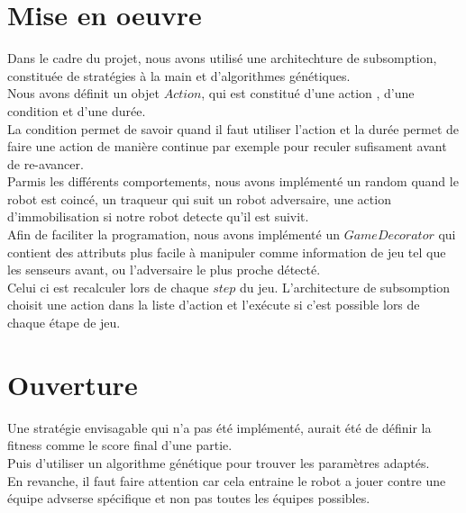 \documentclass[11pt]{article}
\begin{document}
\section{Mise en oeuvre}
Dans le cadre du projet, nous avons utilisé une architechture de subsomption, constituée de stratégies à la main et d'algorithmes génétiques. \\
Nous avons définit un objet $Action$, qui est constitué d'une action , d'une condition et d'une durée. \\
La condition permet de savoir quand il faut utiliser l'action et la durée permet de faire une action de manière continue par exemple pour reculer sufisament avant de re-avancer. \\
Parmis les différents comportements, nous avons implémenté un random quand le robot est coincé, un traqueur qui suit un robot adversaire, une action d'immobilisation si notre robot detecte qu'il est suivit. \\
Afin de faciliter la programation, nous avons implémenté un $GameDecorator$ qui contient des attributs plus facile à manipuler comme information de jeu tel que les senseurs avant, ou l'adversaire le plus proche détecté. \\
Celui ci est recalculer lors de chaque $step$ du jeu.
L'architecture de subsomption choisit une action dans la liste d'action et l'exécute si c'est possible lors de chaque étape de jeu.

\section{Ouverture}
Une stratégie envisagable qui n'a pas été implémenté, aurait été de définir la fitness comme le score final d'une partie. \\
Puis d'utiliser un algorithme génétique pour trouver les paramètres adaptés. \\
En revanche, il faut faire attention car cela entraine le robot a jouer contre une équipe advserse spécifique et non pas toutes les équipes possibles.
\end{document}

